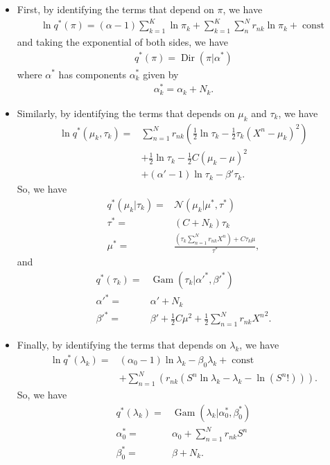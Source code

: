 \documentclass[11pt]{extarticle}
\newcommand{\N}{\mathcal{N}}
\newcommand{\0}{\mathbf{0}}
\renewcommand{\(}{\left(}
\renewcommand{\)}{\right)}
\DeclareMathOperator{\const}{const}
\DeclareMathOperator{\Dir}{Dir}
\DeclareMathOperator{\Gam}{Gam}
\theoremstyle{definition}
\begin{document}
\begin{itemize}
\item First, by identifying the terms that depend on $\pi$, we have
\begin{align*}
	\ln q^{*}(\pi) = (\alpha - 1) \sum_{k=1}^{K}\ln \pi_{k} + \sum_{k=1}^{K}\sum_{n}^{N}r_{nk}\ln \pi_{k} + \const
\end{align*}
and taking the exponential of both sides, we have
\begin{align*}
	q^{*}(\pi) = \Dir(\pi \vert \alpha^{*})
\end{align*}
where $\alpha^{*}$ has components $\alpha^{*}_{k}$ given by
\begin{align*}
	\alpha^{*}_{k} = \alpha_{k} + N_{k}.
\end{align*}

\item Similarly, by identifying the terms that depends on $\mu_{k}$ and $\tau_{k}$, we have
\begin{align*}
	\ln q^{*}(\mu_{k}, \tau_{k}) =& \sum_{n=1}^{N}r_{nk}\left(\frac{1}{2}\ln\tau_{k}-\frac{1}{2}\tau_{k}\left(X^{n}-\mu_{k}\right)^{2}\right) \\ & + \frac{1}{2}\ln\tau_{k} - \frac{1}{2}C(\mu_{k} - \mu)^{2} \\ & + (\alpha'-1)\ln\tau_{k} - \beta'\tau_{k}.
\end{align*}
So, we have
\begin{align*}
	q^{*}(\mu_{k} \vert \tau_{k}) =& \N(\mu_{k} \vert \mu^{*}, \tau^{*}) \\
	\tau^{*} =& (C + N_{k})\tau_{k} \\
	\mu^{*} =& \frac{\left(\tau_{k} \sum_{n=1}^{N} r_{nk}X^{n}\right) + C\tau_{k}\mu}{\tau^{*}},
\end{align*}
and
\begin{align*}
	q^{*}(\tau_{k}) =& \Gam(\tau_{k} \vert \alpha'^{*}, \beta'^{*}) \\
	\alpha'^{*} =& \alpha' + N_{k} \\
	\beta'^{*} =& \beta' + \frac{1}{2}C\mu^{2} + \frac{1}{2}\sum_{n=1}^{N}r_{nk}{X^{n}}^{2}.
\end{align*}

\item Finally, by identifying the terms that depends on $\lambda_{k}$, we have
\begin{align*}
	\ln q^{*}(\lambda_{k}) =& (\alpha_{0}-1)\ln\lambda_{k} - \beta_{0}\lambda_{k} + \const \\ & + \sum_{n=1}^{N}\left(r_{nk}\left(S^{n}\ln\lambda_{k} - \lambda_{k} - \ln \left(S^{n}!\right)\right)\right).
\end{align*}
So, we have
\begin{align*}
	q^{*}(\lambda_{k}) =& \Gam(\lambda_{k} \vert \alpha_{0}^{*}, \beta_{0}^{*}) \\
	\alpha_{0}^{*} =& \alpha_{0} + \sum_{n=1}^{N} r_{nk}S^{n} \\
	\beta_{0}^{*} =& \beta + N_{k}.
\end{align*}
\end{itemize}
\end{document}
